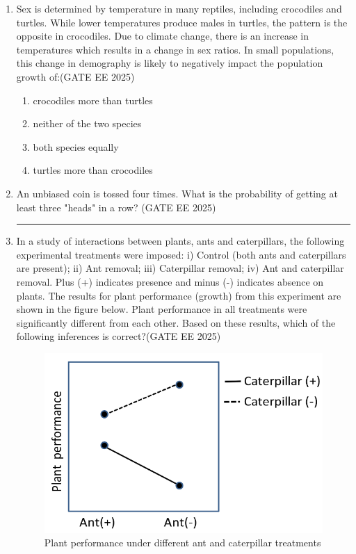 \begin{enumerate}[leftmargin=*,label=\textbf{Q.\arabic*},resume]
\item Sex is determined by temperature in many reptiles, including crocodiles and turtles. While lower temperatures produce males in turtles, the pattern is the opposite in crocodiles. Due to climate change, there is an increase in temperatures which results in a change in sex ratios. In small populations, this change in demography is likely to negatively impact the population growth of:\hfill {(GATE EE 2025)}
\begin{multicols}{2}
\begin{enumerate}
\item crocodiles more than turtles
\item neither of the two species
\item both species equally
\item turtles more than crocodiles
\end{enumerate}
\end{multicols}

\item An unbiased coin is tossed four times. What is the probability of getting at least three "heads" in a row? \hfill {(GATE EE 2025)}

\rule{4cm}{0.15mm}

\item In a study of interactions between plants, ants and caterpillars, the following experimental treatments were imposed: i) Control (both ants and caterpillars are present); ii) Ant removal; iii) Caterpillar removal; iv) Ant and caterpillar removal. Plus (+) indicates presence and minus (-) indicates absence on plants. The results for plant performance (growth) from this experiment are shown in the figure below. Plant performance in all treatments were significantly different from each other. Based on these results, which of the following inferences is correct?\hfill {(GATE EE 2025)}

\begin{figure}[H]
    \centering
    \includegraphics[width=0.9\columnwidth]{figs/imageQ48.png}
    \caption{Plant performance under different ant and caterpillar treatments}
    \label{fig:q48-performance}
\end{figure}


\end{enumerate}
